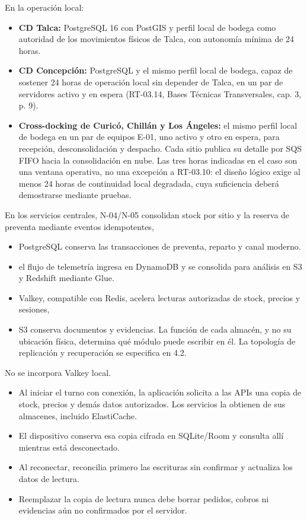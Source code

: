 En la operación local:
\begin{itemize}
  \item \textbf{CD Talca:} PostgreSQL 16 con PostGIS y perfil local de bodega como autoridad de los movimientos físicos de Talca, con autonomía mínima de 24 horas.
  \item \textbf{CD Concepción:} PostgreSQL y el mismo perfil local de bodega, capaz de sostener 24 horas de operación local sin depender de Talca, en un par de servidores activo y en espera (RT-03.14, Bases Técnicas Transversales, cap. 3, p. 9).
  \item \textbf{Cross-docking de Curicó, Chillán y Los Ángeles:} el mismo perfil local de bodega en un par de equipos E-01, uno activo y otro en espera, para recepción, desconsolidación y despacho. Cada sitio publica su detalle por SQS FIFO hacia la consolidación en nube. Las tres horas indicadas en el caso son una ventana operativa, no una excepción a RT-03.10: el diseño lógico exige al menos 24 horas de continuidad local degradada, cuya suficiencia deberá demostrarse mediante pruebas.
\end{itemize}

En los servicios centrales, N-04/N-05 consolidan stock por sitio y la reserva de preventa mediante eventos idempotentes,

\begin{itemize}
  \item PostgreSQL conserva las transacciones de preventa, reparto y canal moderno.
  \item el flujo de telemetría ingresa en DynamoDB y se consolida para análisis en S3 y Redshift mediante Glue.
  \item Valkey, compatible con Redis, acelera lecturas autorizadas de stock, precios y sesiones,
  \item S3 conserva documentos y evidencias. La función de cada almacén, y no su ubicación física, determina qué módulo puede escribir en él. La topología de replicación y recuperación se especifica en 4.2.
\end{itemize}

No se incorpora Valkey local.

\begin{itemize}
  \item Al iniciar el turno con conexión, la aplicación solicita a las APIs una copia de stock, precios y demás datos autorizados. Los servicios la obtienen de sus almacenes, incluido ElastiCache.
  \item El dispositivo conserva esa copia cifrada en SQLite/Room y consulta allí mientras está desconectado.
  \item Al reconectar, reconcilia primero las escrituras sin confirmar y actualiza los datos de lectura.
  \item Reemplazar la copia de lectura nunca debe borrar pedidos, cobros ni evidencias aún no confirmados por el servidor.
\end{itemize}

